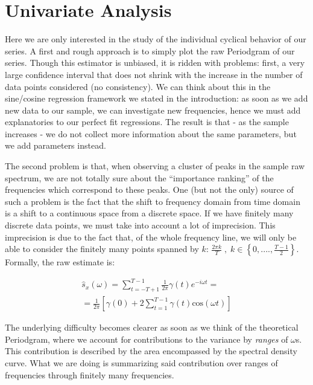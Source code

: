\documentclass[12pt]{article} %
\begin{document}
\newpage

\section{Univariate Analysis}

Here we are only interested in the study of the individual cyclical behavior of our series. A first and rough approach is to simply plot the raw Periodgram of our series. Though this estimator is unbiased, it is ridden with problems: first, a very large confidence interval that does not shrink with the increase in the number of data points considered (no consistency). We can think about this in the sine/cosine regression framework we stated in the introduction: as soon as we add new data to our sample, we can investigate new frequencies, hence we must add explanatories to our perfect fit regressions.  The result is that - as the sample increases - we do not collect more information about the same parameters, but we add parameters instead.

The second problem is that, when observing a cluster of peaks in the sample raw spectrum, we are not totally sure about the ``importance ranking'' of the frequencies which correspond to these peaks. One (but not the only) source of such a problem is the fact that the shift to frequency domain from time domain is a shift to a continuous space from a discrete space. If we have finitely many discrete data points, we must take into account a lot of imprecision. This imprecision is due to the fact that, of the whole frequency line, we will only be able to consider the finitely many points spanned by $k$: $\frac{2\pi k}{T}\;,\;k\in\left\{0,....,\frac{T-1}{2}\right\}$. Formally, the raw estimate is:

\begin{equation}
\begin{aligned}
\hat{s}_x(\omega)=\sum\limits_{t=-T+1}^{T-1} \frac{1}{2\pi} \gamma(t)e^{-i\omega t}=\\
=\frac{1}{2\pi}\left[\gamma(0)+2\sum\limits_{t=1}^{T-1} \gamma(t)\text{cos}(\omega t)\right]
\end{aligned}
\end{equation}

The underlying difficulty becomes clearer as soon as we think of the theoretical Periodgram, where we account for contributions to the variance by {\em ranges} of $\omega$s. This contribution is described by the area encompassed by the spectral density curve. What we are doing is summarizing said contribution over ranges of frequencies through finitely many frequencies.
\end{document}
